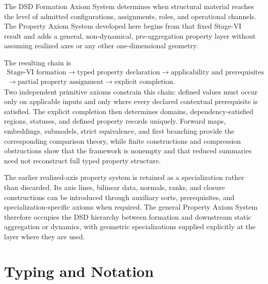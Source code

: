 \documentclass[11pt]{article}
\theoremstyle{definition}
\theoremstyle{remark}
\begin{document}
The DSD Formation Axiom System determines when structural material reaches the level of admitted configurations, assignments, roles, and operational channels.
The Property Axiom System developed here begins from that fixed Stage-VI result and adds a general, non-dynamical, pre-aggregation property layer without assuming realized axes or any other one-dimensional geometry.

The resulting chain is
\[
\begin{gathered}
\text{Stage-VI formation}
\longrightarrow
\text{typed property declaration}
\longrightarrow
\text{applicability and prerequisites}\\
\longrightarrow
\text{partial property assignment}
\longrightarrow
\text{explicit completion}.
\end{gathered}
\]
Two independent primitive axioms constrain this chain: defined values must occur only on applicable inputs and only where every declared contextual prerequisite is satisfied.
The explicit completion then determines domains, dependency-satisfied regions, statuses, and defined property records uniquely.
Forward maps, embeddings, submodels, strict equivalence, and first branching provide the corresponding comparison theory, while finite constructions and compression obstructions show that the framework is nonempty and that reduced summaries need not reconstruct full typed property structure.

The earlier realized-axis property system is retained as a specialization rather than discarded.
Its axis lines, bilinear data, normals, ranks, and closure constructions can be introduced through auxiliary sorts, prerequisites, and specialization-specific axioms when required.
The general Property Axiom System therefore occupies the DSD hierarchy between formation and downstream static aggregation or dynamics, with geometric specializations supplied explicitly at the layer where they are used.

\appendix
\section{Typing and Notation}
\label{app:notation}
\end{document}
